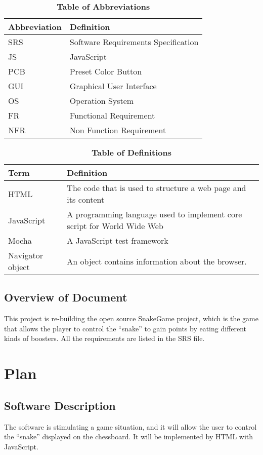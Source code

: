 \documentclass[12pt, titlepage]{article}
\begin{document}
\begin{table}[hbp]
\caption{\textbf{Table of Abbreviations}} \label{Table}

\begin{tabularx}{\textwidth}{p{3cm}X}
\toprule
\textbf{Abbreviation} & \textbf{Definition} \\
\midrule
SRS & Software Requirements Specification\\
JS & JavaScript\\
PCB & Preset Color Button\\
GUI & Graphical User Interface\\
OS & Operation System\\
FR & Functional Requirement\\
NFR & Non Function Requirement\\
\bottomrule
\end{tabularx}

\end{table}

\begin{table}[!htbp]
\caption{\textbf{Table of Definitions}} \label{Table}
\begin{tabularx}{\textwidth}{p{3cm}X}
\toprule
\textbf{Term} & \textbf{Definition}\\
\midrule
HTML & The code that is used to structure a web page and
its content\\
JavaScript & A programming language used to implement core script for World Wide Web\\
Mocha & A JavaScript test framework\\
Navigator object & An object contains information about the browser.\\
\bottomrule
\end{tabularx}
\end{table}	

\subsection{Overview of Document}
This project is re-building the open source SnakeGame project, which is the game that allows the player to control the ``snake'' to gain points by eating different kinds of boosters. All the requirements are listed in the SRS file.

\section{Plan}
	
\subsection{Software Description}
The software is stimulating a game situation, and it will allow the user to control the ``snake'' displayed on the chessboard. It will be implemented by HTML with JavaScript.
\end{document}
